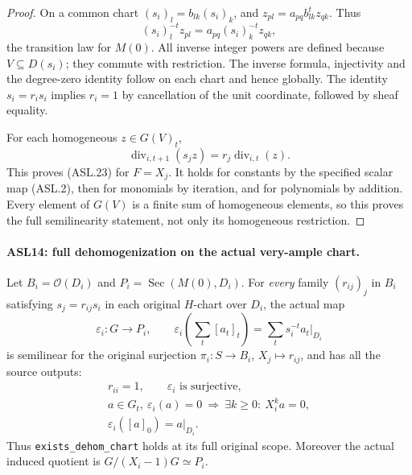\begin{proof}
On a common chart $(s_i)_l=b_{lk}(s_i)_k$, and
$z_{pl}=a_{pq}b_{lk}^{t}z_{qk}$.  Thus
\[
 (s_i)_l^{-t}z_{pl}
       =a_{pq}(s_i)_k^{-t}z_{qk},
\]
the transition law for $M(0)$.  All inverse integer powers
are defined because $V\subseteq D(s_i)$; they commute with
restriction.  The inverse formula, injectivity and the
degree-zero identity follow on each chart and hence globally.
The identity $s_i=r_is_i$ implies $r_i=1$ by cancellation
of the unit coordinate, followed by sheaf equality.

For each homogeneous $z\in G(V)_t$,
\[
 \operatorname{div}_{i,t+1}(s_jz)
               =r_j\operatorname{div}_{i,t}(z).
\]
This proves (ASL.23) for $F=X_j$.  It holds for constants by
the specified scalar map (ASL.2), then for monomials by iteration,
and for polynomials by addition.  Every element of $G(V)$ is a
finite sum of homogeneous elements, so this proves the full
semilinearity statement, not only its homogeneous restriction.
\end{proof}

\paragraph{ASL14: full dehomogenization on the actual very-ample chart.}
\label{claim:ASL14}
Let $B_i=\mathcal O(D_i)$ and
$P_i=\operatorname{Sec}(M(0),D_i)$.  For \emph{every} family
$(r_{ij})_j$ in $B_i$ satisfying $s_j=r_{ij}s_i$ in each original
$H$-chart over $D_i$, the actual map
\[
 \varepsilon_i:G\longrightarrow P_i,
 \qquad \varepsilon_i\left(\sum_t[a_t]_t\right)
                     =\sum_t s_i^{-t}a_t|_{D_i}
                                                        \tag{ASL.24}
\]
is semilinear for the original surjection
$\pi_i:S\to B_i$, $X_j\mapsto r_{ij}$, and has all the
source outputs:
\[
 \begin{gathered}
 r_{ii}=1,\qquad \varepsilon_i\text{ is surjective},\\
 a\in G_t,\ \varepsilon_i(a)=0
       \ \Longrightarrow\ \exists k\ge0:\ X_i^ka=0,\\
 \varepsilon_i([a]_0)=a|_{D_i}.
 \end{gathered}                                         \tag{ASL.25}
\]
Thus \texttt{exists\_\allowbreak{}dehom\_\allowbreak{}chart} holds at its full original
scope.  Moreover the actual induced quotient is
$G/(X_i-1)G\simeq P_i$.

